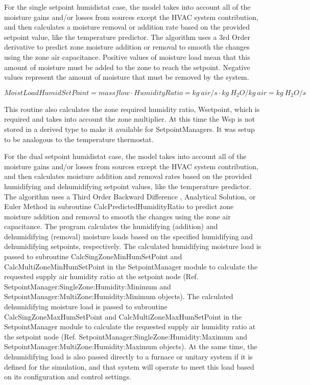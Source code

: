 For the single setpoint humidistat case, the model takes into account all of the moisture gains and/or losses from sources except the HVAC system contribution, and then calculates a moisture removal or addition rate based on the provided setpoint value, like the temperature predictor. The algorithm uses a 3rd Order derivative to predict zone moisture addition or removal to smooth the changes using the zone air capacitance. Positive values of moisture load mean that this amount of moisture must be added to the zone to reach the setpoint. Negative values represent the amount of moisture that must be removed by the system.

\begin{equation}
{MoistLoadHumidSetPoint} = {massflow} \cdot {HumidityRatio} = {kg~air/s} \cdot {kg~{H_2}O} / {kg~air} = {kg~{H_2}O/s}
\end{equation}

This routine also calculates the zone required humidity ratio, Wsetpoint, which is required and takes into account the zone multiplier. At this time the Wsp is not stored in a derived type to make it available for SetpointManagers. It was setup to be analogous to the temperature thermostat.

For the dual setpoint humidistat case, the model takes into account all of the moisture gains and/or losses from sources except the HVAC system contribution, and then calculates moisture addition and removal rates based on the provided humidifying and dehumidifying setpoint values, like the temperature predictor. The algorithm uses a Third Order Backward Difference , Analytical Solution, or Euler Method in subroutine CalcPredictedHumidityRatio to predict zone moisture addition and removal to smooth the changes using the zone air capacitance. The program calculates the humidifying (addition) and dehumidifying (removal) moisture loads based on the specified humidifying and dehumidifying setpoints, respectively. The calculated humidifying moisture load is passed to subroutine CalcSingZoneMinHumSetPoint and CalcMultiZoneMinHumSetPoint in the SetpointManager module to calculate the requested supply air humidity ratio at the setpoint node (Ref. SetpointManager:SingleZone:Humidity:Minimum and SetpointManager:MultiZone:Humidity:Minimum objects). The calculated dehumidifying moisture load is passed to subroutine CalcSingZoneMaxHumSetPoint and CalcMultiZoneMaxHumSetPoint in the SetpointManager module to calculate the requested supply air humidity ratio at the setpoint node (Ref. SetpointManager:SingleZone:Humidity:Maximum and SetpointManager:MultiZone:Humidity:Maximum objects). At the same time, the dehumidifying load is also passed directly to a furnace or unitary system if it is defined for the simulation, and that system will operate to meet this load based on its configuration and control settings.

